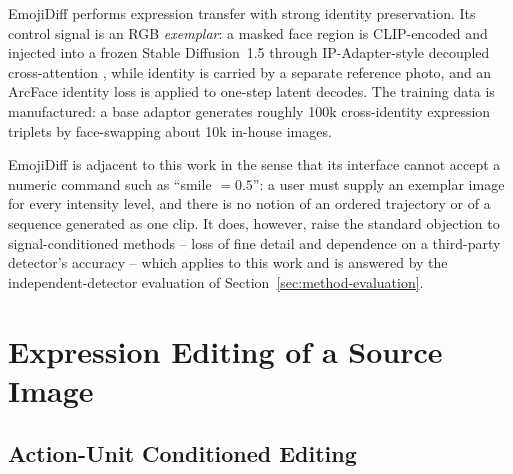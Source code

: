 
EmojiDiff \citep{jiang2024emojidiff} performs expression transfer with strong identity
preservation. Its control signal is an RGB \emph{exemplar}: a masked face region is CLIP-encoded
and injected into a frozen Stable Diffusion~1.5 through IP-Adapter-style decoupled
cross-attention \citep{ye2023ipadapter}, while identity is carried by a separate reference photo,
and an ArcFace identity loss \citep{deng2019arcface} is applied to one-step latent decodes. The
training data is manufactured: a base adaptor generates roughly 100k cross-identity expression
triplets by face-swapping about 10k in-house images.

EmojiDiff is adjacent to this work in the sense that its interface cannot accept a
numeric command such as ``smile $=0.5$'': a user must supply an exemplar image for every
intensity level, and there is no notion of an ordered trajectory or of a sequence generated as
one clip. It does, however, raise the standard objection to signal-conditioned methods -- loss
of fine detail and dependence on a third-party detector's accuracy -- which applies to this work
and is answered by the independent-detector evaluation of Section~\ref{sec:method-evaluation}.

\section{Expression Editing of a Source Image}\label{sec:rw-editing}

\subsection{Action-Unit Conditioned Editing}\label{subsec:rw-magicface}



